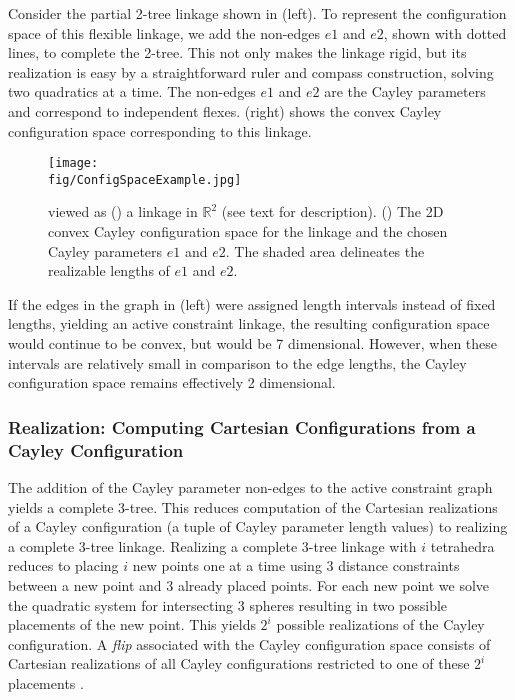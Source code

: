 Consider the partial 2-tree linkage shown in  (left).  To
represent the configuration space of this flexible linkage, we add the
non-edges $e1$ and $e2$, shown with dotted lines, to complete the 2-tree. This
not only makes the linkage rigid, but its realization is easy by a
straightforward ruler and compass construction, solving two quadratics at a
time. The non-edges $e1$ and $e2$ are the Cayley parameters and correspond to
independent flexes.   (right) shows the convex Cayley configuration
space corresponding to this linkage. 


\begin{figure}[h]
\begin{center}
\texttt{[image: \\fig/ConfigSpaceExample.jpg]}
\end{center}
\caption{\exref{\toytwod} viewed as
(\IL) a linkage in $\mathbb{R}^2$ (see text for description). (\IR)
The 2D convex Cayley configuration space for the linkage and the chosen Cayley
parameters $e1$ and $e2$. The shaded area delineates the realizable lengths of
$e1$ and $e2$.} 
\label{fig:2DCayley}
\end{figure}


If the edges in the graph in  (left) were assigned length
intervals instead of fixed lengths, yielding an active constraint linkage, the
resulting configuration space would continue to be convex, but would be 7
dimensional. However, when these intervals are relatively small in comparison
to the edge lengths, the Cayley configuration space remains effectively 2
dimensional.


\subsubsection{Realization: Computing Cartesian Configurations from a Cayley Configuration}
\label{sec:realization} 
The addition of the Cayley parameter non-edges to the active constraint graph
yields a complete 3-tree. This reduces computation of the Cartesian
realizations of a Cayley configuration (a tuple of Cayley parameter length
values) to realizing a complete 3-tree linkage. Realizing a complete 3-tree
linkage with $i$ tetrahedra reduces to placing $i$ new points one at a time
using 3 distance constraints between a new point and 3 already placed points.
For each new point we solve the quadratic system for intersecting 3 spheres
resulting in two possible placements of the new point. This yields $2^i$
possible realizations of the Cayley configuration. A \emph{flip} associated
with the Cayley configuration space consists of Cartesian realizations of all
Cayley configurations restricted to one of these $2^i$ placements
\cite{Ozkan2014MainEasal}. 

